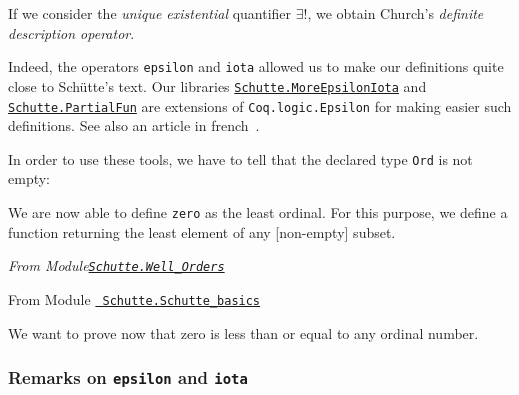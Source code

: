 


If we consider the \emph{unique existential} quantifier $\exists!$, we obtain
Church's \emph{definite description operator}.



Indeed, the operators \texttt{epsilon} and \texttt{iota} allowed us to make our definitions 
quite close to Schütte's text. Our libraries \href{../theories/html/hydras.Schutte.MoreEpsilonIota.html}%
{\texttt{Schutte.MoreEpsilonIota}}
and
\href{../theories/html/hydras.Schutte.PartialFun.html}%
{\texttt{Schutte.PartialFun}} are extensions of \texttt{Coq.logic.Epsilon} for making easier 
such definitions. See also an article in french~\cite{PCiota}. 





In order to use these tools,  we have to tell \coq{}  that the declared type \texttt{Ord} is not empty:






We are now able to define \texttt{zero} as the least ordinal. For this purpose,
we define a function returning the least element of any [non-empty]  subset.


\emph{From Module\href{../theories/html/hydras.Schutte.Well_Orders.html}%
  {\texttt{Schutte.Well\_Orders}}}






\vspace{4pt}

From Module \href{../theories/html/hydras.Schutte.Schutte_basics.html}%
{\texttt{~Schutte.Schutte\_basics}}

\label{Constants:zero:Ord}



We want to prove now that zero is less than or equal to any ordinal number.




\subsubsection{Remarks on \texttt{epsilon} and \texttt{iota}}

